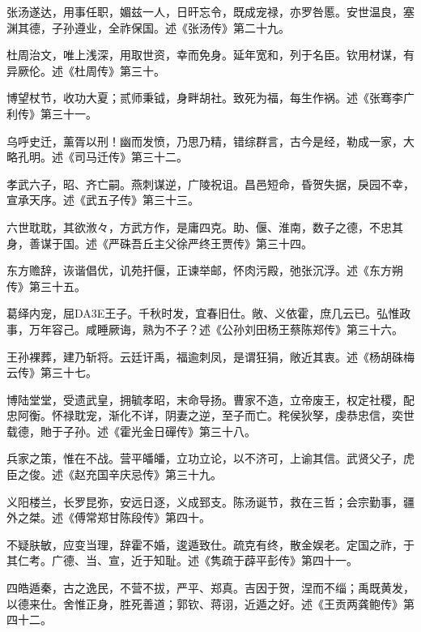 \documentclass[12pt,UTF8]{ctexbook}
\begin{document}
张汤遂达，用事任职，媚兹一人，日旰忘令，既成宠禄，亦罗咎慝。安世温良，塞渊其德，子孙遵业，全祚保国。述《张汤传》第二十九。



杜周治文，唯上浅深，用取世资，幸而免身。延年宽和，列于名臣。钦用材谋，有异厥伦。述《杜周传》第三十。



博望杖节，收功大夏；贰师秉钺，身畔胡社。致死为福，每生作祸。述《张骞李广利传》第三十一。



乌呼史迁，薰胥以刑！幽而发愤，乃思乃精，错综群言，古今是经，勒成一家，大略孔明。述《司马迁传》第三十二。



孝武六子，昭、齐亡嗣。燕刺谋逆，广陵祝诅。昌邑短命，昏贺失据，戾园不幸，宣承天序。述《武五子传》第三十三。



六世耽耽，其欲浟々，方武方作，是庸四克。助、偃、淮南，数子之德，不忠其身，善谋于国。述《严硃吾丘主父徐严终王贾传》第三十四。



东方赡辞，诙谐倡优，讥苑扞偃，正谏举邮，怀肉污殿，弛张沉浮。述《东方朔传》第三十五。



葛绎内宠，屈DA3E王子。千秋时发，宜春旧仕。敞、义依霍，庶几云已。弘惟政事，万年容己。咸睡厥诲，熟为不子？述《公孙刘田杨王蔡陈郑传》第三十六。



王孙裸葬，建乃斩将。云廷讦禹，福逾刺凤，是谓狂狷，敞近其衷。述《杨胡硃梅云传》第三十七。



博陆堂堂，受遗武皇，拥毓孝昭，末命导扬。曹家不造，立帝废王，权定社稷，配忠阿衡。怀禄耽宠，渐化不详，阴妻之逆，至子而亡。秺侯狄孥，虔恭忠信，奕世载德，貤于子孙。述《霍光金日磾传》第三十八。



兵家之策，惟在不战。营平皤皤，立功立论，以不济可，上谕其信。武贤父子，虎臣之俊。述《赵充国辛庆忌传》第三十九。



义阳楼兰，长罗昆弥，安远日逐，义成郅支。陈汤诞节，救在三哲；会宗勤事，疆外之桀。述《傅常郑甘陈段传》第四十。



不疑肤敏，应变当理，辞霍不婚，逡遁致仕。疏克有终，散金娱老。定国之祚，于其仁考。广德、当、宣，近于知耻。述《隽疏于薜平彭传》第四十一。



四皓遁秦，古之逸民，不营不拔，严平、郑真。吉因于贺，涅而不缁；禹既黄发，以德来仕。舍惟正身，胜死善道；郭钦、蒋诩，近遁之好。述《王贡两龚鲍传》第四十二。
\end{document}
